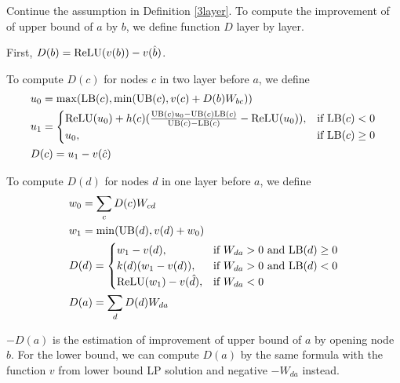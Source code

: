\begin{definition}
	Continue the assumption in Definition \ref{3layer}. To compute the improvement of of upper bound of $a$ by $b$, we define function $D$ layer by layer.
	
	First, $D(b) = \mathrm{ReLU}(v(b))-v(\hat{b})$.
	
To compute $D(c)$ for nodes $c$ in two layer before $a$, we define \begin{align}
	&u_0 = \max(\mathrm{LB}(c),\min(\mathrm{UB}(c),  v(c)+D(b)W_{bc}))\\
	&u_1 = \begin{cases}
		\mathrm{ReLU}(u_0)+h(c)(\frac{\mathrm{UB}(c)u_0-\mathrm{UB}(c)\mathrm{LB}(c)}{\mathrm{UB}(c)-\mathrm{LB}(c)}-\mathrm{ReLU}(u_0)), & \text{if }\mathrm{LB}(c) < 0\\
	u_0, & \text{if }  \mathrm{LB}(c) \geq 0
	\end{cases}\\
	&D(c) = u_1-v(\hat{c})
\end{align}
	
	To compute $D(d)$ for nodes $d$ in one layer before $a$, we define 
	\begin{align}
		&w_0 = \sum_c D(c)W_{cd}\\
		&w_1 = \min(\mathrm{UB}(d),v(d)+w_0)\\		
		&D(d) =
		\begin{cases}
			w_1-v({d}), & \text{if }W_{da} > 0 \text{ and } \mathrm{LB}(d)\geq 0\\
		k(d)(w_1-v({d})), & \text{if }W_{da} > 0 \text{ and } \mathrm{LB}(d)< 0\\
		\mathrm{ReLU}(w_1)-v(\hat{d})	, & \text{if }  W_{da} < 0
		\end{cases}\\
		&D(a) = \sum_d D(d)W_{da}
	\end{align}
\end{definition} $-D(a)$ is the estimation of improvement of upper bound of $a$ by opening node $b$.  For the lower bound, we can compute $D(a)$ by the same formula with the function $v$ from lower bound LP solution and negative $-W_{da}$  instead.
		